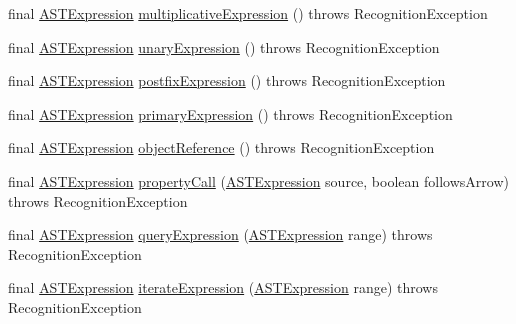 \begin{DoxyCompactItemize}
\item 
final \hyperlink{classorg_1_1tzi_1_1use_1_1parser_1_1ocl_1_1_a_s_t_expression}{A\-S\-T\-Expression} \hyperlink{classorg_1_1tzi_1_1use_1_1parser_1_1soil_1_1_soil_parser_ac960f31d31ca0d1e2b86469ef70296b5}{multiplicative\-Expression} ()  throws Recognition\-Exception 
\item 
final \hyperlink{classorg_1_1tzi_1_1use_1_1parser_1_1ocl_1_1_a_s_t_expression}{A\-S\-T\-Expression} \hyperlink{classorg_1_1tzi_1_1use_1_1parser_1_1soil_1_1_soil_parser_af64efc2f8bb77be306e7e73fb592670a}{unary\-Expression} ()  throws Recognition\-Exception 
\item 
final \hyperlink{classorg_1_1tzi_1_1use_1_1parser_1_1ocl_1_1_a_s_t_expression}{A\-S\-T\-Expression} \hyperlink{classorg_1_1tzi_1_1use_1_1parser_1_1soil_1_1_soil_parser_a461da04a6622ec0a3ff7b05b983e0726}{postfix\-Expression} ()  throws Recognition\-Exception 
\item 
final \hyperlink{classorg_1_1tzi_1_1use_1_1parser_1_1ocl_1_1_a_s_t_expression}{A\-S\-T\-Expression} \hyperlink{classorg_1_1tzi_1_1use_1_1parser_1_1soil_1_1_soil_parser_afa168f5046b3bfbf6f4b211571e650ac}{primary\-Expression} ()  throws Recognition\-Exception 
\item 
final \hyperlink{classorg_1_1tzi_1_1use_1_1parser_1_1ocl_1_1_a_s_t_expression}{A\-S\-T\-Expression} \hyperlink{classorg_1_1tzi_1_1use_1_1parser_1_1soil_1_1_soil_parser_a62bc450eabe81d9bbde5754209f0ba42}{object\-Reference} ()  throws Recognition\-Exception 
\item 
final \hyperlink{classorg_1_1tzi_1_1use_1_1parser_1_1ocl_1_1_a_s_t_expression}{A\-S\-T\-Expression} \hyperlink{classorg_1_1tzi_1_1use_1_1parser_1_1soil_1_1_soil_parser_a51b5578d6e5fe74e64e8223b34e1a28e}{property\-Call} (\hyperlink{classorg_1_1tzi_1_1use_1_1parser_1_1ocl_1_1_a_s_t_expression}{A\-S\-T\-Expression} source, boolean follows\-Arrow)  throws Recognition\-Exception 
\item 
final \hyperlink{classorg_1_1tzi_1_1use_1_1parser_1_1ocl_1_1_a_s_t_expression}{A\-S\-T\-Expression} \hyperlink{classorg_1_1tzi_1_1use_1_1parser_1_1soil_1_1_soil_parser_a47b2557c3190c3e01482fcd129046024}{query\-Expression} (\hyperlink{classorg_1_1tzi_1_1use_1_1parser_1_1ocl_1_1_a_s_t_expression}{A\-S\-T\-Expression} range)  throws Recognition\-Exception 
\item 
final \hyperlink{classorg_1_1tzi_1_1use_1_1parser_1_1ocl_1_1_a_s_t_expression}{A\-S\-T\-Expression} \hyperlink{classorg_1_1tzi_1_1use_1_1parser_1_1soil_1_1_soil_parser_a7dd157bb477a2d28852f9d3d51fb8c3b}{iterate\-Expression} (\hyperlink{classorg_1_1tzi_1_1use_1_1parser_1_1ocl_1_1_a_s_t_expression}{A\-S\-T\-Expression} range)  throws Recognition\-Exception 

\end{DoxyCompactItemize}
